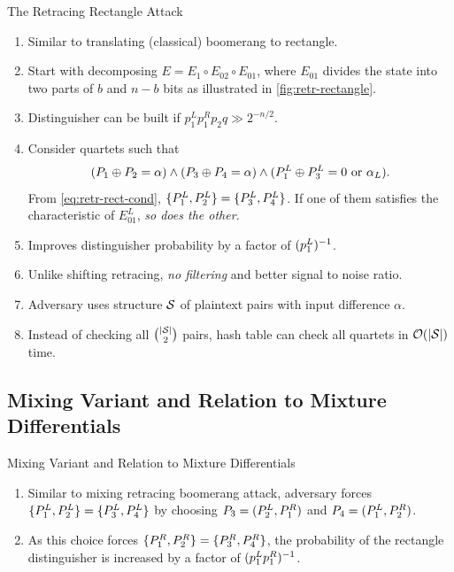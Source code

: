 \documentclass[notheorems]{beamer}
\theoremstyle{definition}
\theoremstyle{example}
\begin{document}
    \begin{frame}{The Retracing Rectangle Attack}
        \begin{enumerate}[<+->]
            \item Similar to translating (classical) boomerang to rectangle.
            \item Start with decomposing \(E = E_1 \circ E_{02} \circ E_{01}\),
            where \(E_{01}\) divides the state into two parts of \(b\) and \(n -
            b\) bits as illustrated in \cref{fig:retr-rectangle}.
            \item Distinguisher can be built if \(p_1^Lp_1^Rp_2q \gg 2^{-n/2}\).
            \item Consider quartets such that
            \begin{equation}
                (P_1 \oplus P_2 = \alpha) \land (P_3 \oplus P_4 = \alpha) \land (P_1^L \oplus P_3^L = 0 \textrm{ or } \alpha_L).
                \label{eq:retr-rect-cond}
            \end{equation}
            From \eqref{eq:retr-rect-cond}, \(\{P_1^L, P_2^L\} =
            \{P_3^L, P_4^L\}\). If one of them satisfies the characteristic
            of \(E_{01}^L\), \emph{so does the other.}
            \item Improves distinguisher probability by a factor of
            \((p_1^L)^{-1}\).
            \item Unlike shifting retracing, \emph{no filtering} and better
            signal to noise ratio.
            \item Adversary uses structure \(\mathcal S\) of plaintext pairs with input
            difference \(\alpha\).
            \item Instead of checking all \(\binom{\left\vert\mathcal S\right\vert}{2}\) pairs, hash
            table can check all quartets in \(\mathcal O(\left\vert\mathcal S\right\vert)\) time.
        \end{enumerate}
    \end{frame}

    \subsection{Mixing Variant and Relation to Mixture Differentials}
    \label{subsec:mixing-variant}

    \begin{frame}[<+->]{Mixing Variant and Relation to Mixture Differentials}
        \begin{enumerate}
            \item Similar to mixing retracing boomerang attack, adversary forces
            \(\{P_1^L, P_2^L\} = \{P_3^L, P_4^L\}\) by choosing \(P_3 =
            (P_2^L, P_1^R)\) and \(P_4 = (P_1^L, P_2^R)\).
            \item As this choice forces \(\{P_1^R, P_2^R\} = \{P_3^R,
            P_4^R\}\), the probability of the rectangle distinguisher is
            increased by a factor of \((p_1^Lp_1^R)^{-1}\).
        \end{enumerate}
    \end{frame}
\end{document}
